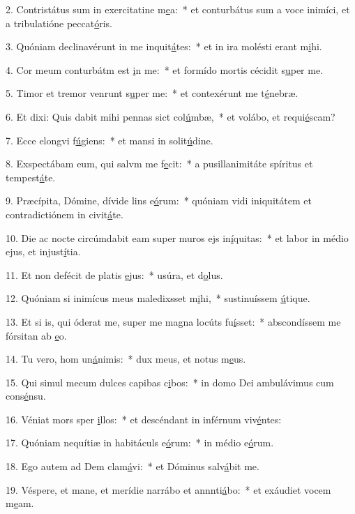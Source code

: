 2. Contristátus sum in exercitatine m\uline{e}a:~* et conturbátus sum a voce inimíci, et a tribulatióne peccat\uline{ó}ris.\par 
3. Quóniam declinavérunt in me inquit\uline{á}tes:~* et in ira molésti erant m\uline{i}hi.\par 
4. Cor meum conturbátm est \uline{i}n me:~* et formído mortis cécidit s\uline{u}per me.\par 
5. Timor et tremor venrunt s\uline{u}per me:~* et contexérunt me t\uline{é}nebræ.\par 
6. Et dixi: Quis dabit mihi pennas sict col\uline{ú}mbæ,~* et volábo, et requi\uline{é}scam?\par 
7. Ecce elongvi f\uline{ú}giens:~* et mansi in solit\uline{ú}dine.\par 
8. Exspectábam eum, qui salvm me f\uline{e}cit:~* a pusillanimitáte spíritus et tempest\uline{á}te.\par 
9. Præcípita, Dómine, dívide lins e\uline{ó}rum:~* quóniam vidi iniquitátem et contradictiónem in civit\uline{á}te.\par 
10. Die ac nocte circúmdabit eam super muros ejs in\uline{í}quitas:~* et labor in médio ejus, et injust\uline{í}tia.\par 
11. Et non defécit de platis \uline{e}jus:~* usúra, et d\uline{o}lus.\par 
12. Quóniam si inimícus meus maledixsset m\uline{i}hi,~* sustinuíssem \uline{ú}tique.\par 
13. Et si is, qui óderat me, super me magna locúts fu\uline{í}sset:~* abscondíssem me fórsitan ab \uline{e}o.\par 
14. Tu vero, hom un\uline{á}nimis:~* dux meus, et notus m\uline{e}us.\par 
15. Qui simul mecum dulces capibas c\uline{i}bos:~* in domo Dei ambulávimus cum cons\uline{é}nsu.\par 
16. Véniat mors sper \uline{i}llos:~* et descéndant in inférnum viv\uline{é}ntes:\par 
17. Quóniam nequítiæ in habitáculs e\uline{ó}rum:~* in médio e\uline{ó}rum.\par 
18. Ego autem ad Dem clam\uline{á}vi:~* et Dóminus salv\uline{á}bit me.\par 
19. Véspere, et mane, et merídie narrábo et annnti\uline{á}bo:~* et exáudiet vocem m\uline{e}am.\par 
